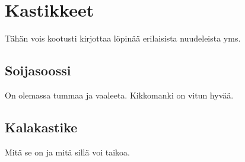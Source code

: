 \documentclass[../keittiokirja.tex]{subfiles}
\begin{document}
\chapter{Kastikkeet}
\label{chp:kastikkeet}

Tähän vois kootusti kirjottaa löpinää erilaisista nuudeleista yms.

\section{Soijasoossi}

On olemassa tummaa ja vaaleeta. Kikkomanki on vitun hyvää.

\section{Kalakastike}

Mitä se on ja mitä sillä voi taikoa.
\end{document}
